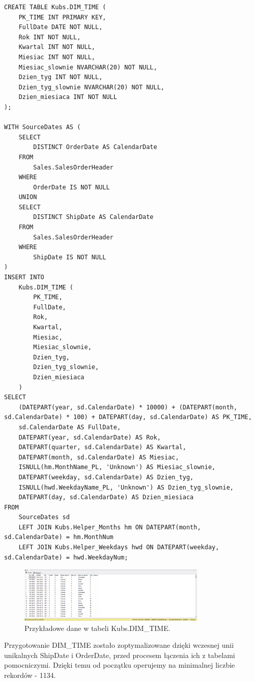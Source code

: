 \documentclass[a4paper,12pt]{article}
\begin{document}
\begin{lstlisting}[caption={Tworzenie i wypełnianie tabeli DIM\_TIME.}, label=lst:zad2_dim_time]
CREATE TABLE Kubs.DIM_TIME (
    PK_TIME INT PRIMARY KEY,
    FullDate DATE NOT NULL,
    Rok INT NOT NULL,
    Kwartal INT NOT NULL,
    Miesiac INT NOT NULL,
    Miesiac_slownie NVARCHAR(20) NOT NULL,
    Dzien_tyg INT NOT NULL,
    Dzien_tyg_slownie NVARCHAR(20) NOT NULL,
    Dzien_miesiaca INT NOT NULL
);

WITH SourceDates AS (
    SELECT
        DISTINCT OrderDate AS CalendarDate
    FROM
        Sales.SalesOrderHeader
    WHERE
        OrderDate IS NOT NULL
    UNION
    SELECT
        DISTINCT ShipDate AS CalendarDate
    FROM
        Sales.SalesOrderHeader
    WHERE
        ShipDate IS NOT NULL
)
INSERT INTO
    Kubs.DIM_TIME (
        PK_TIME,
        FullDate,
        Rok,
        Kwartal,
        Miesiac,
        Miesiac_slownie,
        Dzien_tyg,
        Dzien_tyg_slownie,
        Dzien_miesiaca
    )
SELECT
    (DATEPART(year, sd.CalendarDate) * 10000) + (DATEPART(month, sd.CalendarDate) * 100) + DATEPART(day, sd.CalendarDate) AS PK_TIME,
    sd.CalendarDate AS FullDate,
    DATEPART(year, sd.CalendarDate) AS Rok,
    DATEPART(quarter, sd.CalendarDate) AS Kwartal,
    DATEPART(month, sd.CalendarDate) AS Miesiac,
    ISNULL(hm.MonthName_PL, 'Unknown') AS Miesiac_slownie,
    DATEPART(weekday, sd.CalendarDate) AS Dzien_tyg,
    ISNULL(hwd.WeekdayName_PL, 'Unknown') AS Dzien_tyg_slownie,
    DATEPART(day, sd.CalendarDate) AS Dzien_miesiaca
FROM
    SourceDates sd
    LEFT JOIN Kubs.Helper_Months hm ON DATEPART(month, sd.CalendarDate) = hm.MonthNum
    LEFT JOIN Kubs.Helper_Weekdays hwd ON DATEPART(weekday, sd.CalendarDate) = hwd.WeekdayNum;
\end{lstlisting}

\begin{figure}[H]
    \centering
    \includegraphics[width=0.8\textwidth]{images/2_time_rows.png}
    \caption{Przykładowe dane w tabeli Kubs.DIM\_TIME.}
    \label{fig:dim_time_data}
\end{figure}

Przygotowanie DIM\_TIME zostało zoptymalizowane dzięki wczesnej unii unikalnych ShipDate i OrderDate, przed procesem łączenia ich z tabelami pomocniczymi. Dzięki temu od początku operujemy na minimalnej liczbie rekordów - 1134.
\end{document}
